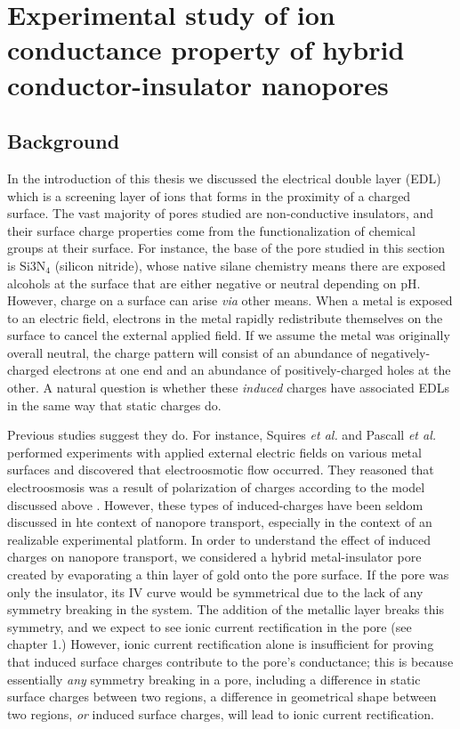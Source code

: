 \graphicspath{{../images/ch3/}}	%


\chapter{Experimental study of ion conductance property of hybrid conductor-insulator nanopores}

	

	\section{Background}
	
		In the introduction of this thesis we discussed the electrical double layer (EDL) which is a screening layer of ions that forms in the proximity of a charged surface. The vast majority of pores studied are non-conductive insulators, and their surface charge properties come from the functionalization of chemical groups at their surface. For instance, the base of the pore studied in this section is $\mathrm{Si{3}N_{4}}$ (silicon nitride), whose native silane chemistry means there are exposed alcohols at the surface that are either negative or neutral depending on pH. However, charge on a surface can arise \textit{via} other means. When a metal is exposed to an electric field, electrons in the metal rapidly redistribute themselves on the surface to cancel the external applied field. If we assume the metal was originally overall neutral, the charge pattern will consist of an abundance of negatively-charged electrons at one end and an abundance of positively-charged holes at the other. A natural question is whether these \textit{induced} charges have associated EDLs in the same way that static charges do.
		
		Previous studies suggest they do. For instance, Squires \textit{et al.} and Pascall \textit{et al.} performed experiments with applied external electric fields on various metal surfaces and discovered that electroosmotic flow occurred. They reasoned that electroosmosis was a result of polarization of charges according to the model discussed above \cite{Squires2004, Pascall2010}. However, these types of induced-charges have been seldom discussed in hte context of nanopore transport, especially in the context of an realizable experimental platform. In order to understand the effect of induced charges on nanopore transport, we considered a hybrid metal-insulator pore created by evaporating a thin layer of gold onto the pore surface. If the pore was only the insulator, its IV curve would be symmetrical due to the lack of any symmetry breaking in the system. The addition of the metallic layer breaks this symmetry, and we expect to see ionic current rectification in the pore (see chapter 1.) However, ionic current rectification alone is insufficient for proving that induced surface charges contribute to the pore's conductance; this is because essentially \textit{any} symmetry breaking in a pore, including a difference in static surface charges between two regions, a difference in geometrical shape between two regions, \textit{or} induced surface charges, will lead to ionic current rectification.
		
